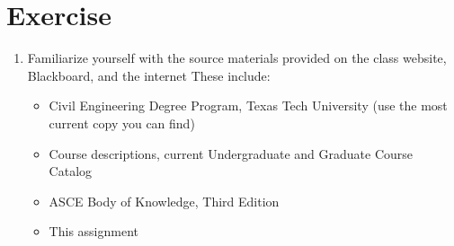 \documentclass[12pt]{article}
\begin{document}
\section*{\small{Exercise}}
\begin{enumerate}
    \item Familiarize yourself with the source materials provided on the class website, Blackboard, and the internet These include:
    \begin{itemize}
        \item Civil Engineering Degree Program, Texas Tech University (use the most current copy you can find)
        \item Course descriptions, current Undergraduate and Graduate Course Catalog
        \item ASCE Body of Knowledge, Third Edition
        \item This assignment
    \end{itemize}


\end{enumerate}
\end{document}
